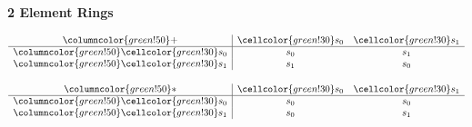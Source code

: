 \documentclass{article}
\begin{document}
\begin{center}
\textbf{2 Element Rings}
\end{center}
\begin{center}
\begin{minipage}{0.28\textwidth}
    \centering
    \renewcommand{\arraystretch}{1.5} 
    \[
    \begin{array}{>{\columncolor{green!50}}c|cc}
    + & \cellcolor{green!30}s_0 & \cellcolor{green!30}s_1 \\ \hline
    \cellcolor{green!30}s_0 & s_0 & s_1 \\
    \cellcolor{green!30}s_1 & s_1 & s_0 \\
    \end{array}
    \]
\end{minipage}%
\begin{minipage}{0.28\textwidth}
    \centering
    \renewcommand{\arraystretch}{1.5} 
    \[
    \begin{array}{>{\columncolor{green!50}}c|cc}
    * & \cellcolor{green!30}s_0 & \cellcolor{green!30}s_1 \\ \hline
    \cellcolor{green!30}s_0 & s_0 & s_0 \\
    \cellcolor{green!30}s_1 & s_0 & s_1 \\
    \end{array}
    \]
\end{minipage}
\end{center}
\end{document}
